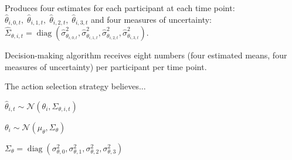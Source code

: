 
Produces four estimates for each participant at each time point: $\hat{\theta}_{i,0,t},\; \hat{\theta}_{i,1,t},\; \hat{\theta}_{i,2,t},\; \hat{\theta}_{i,3,t}$ and four measures of uncertainty: $\hat{\Sigma}_{\theta,i,t}
=
\operatorname{diag}
\left(
\hat{\sigma}^2_{\theta_{i,0,t}},
\hat{\sigma}^2_{\theta_{i,1,t}},
\hat{\sigma}^2_{\theta_{i,2,t}},
\hat{\sigma}^2_{\theta_{i,3,t}}
\right).$


Decision-making algorithm receives eight numbers (four estimated means, four measures of uncertainty) per participant per time point.

The action selection strategy believes...

$\hat{\theta}_{i,t} \sim
\mathcal{N}(\theta_i,\Sigma_{\theta,i,t})$

$\theta_i \sim
\mathcal{N}(\mu_\theta,\Sigma_\theta)$

$\Sigma_\theta =
\operatorname{diag}
(\sigma^2_{\theta,0},\sigma^2_{\theta,1},\sigma^2_{\theta,2},\sigma^2_{\theta,3})$